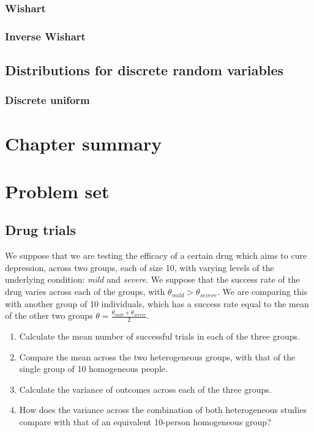 \documentclass[11pt,fullpage]{book}
\begin{document}
\subsubsection{Wishart}
\subsubsection{Inverse Wishart}

\subsection{Distributions for discrete random variables}
\subsubsection{Discrete uniform}

\section{Chapter summary}
\section{Problem set}
\subsection{Drug trials}
We suppose that we are testing the efficacy of a certain drug which aims to cure depression, across two groups, each of size 10, with varying levels of the underlying condition: \textit{mild} and \textit{severe}. We suppose that the success rate of the drug varies across each of the groups, with $\theta_{mild}>\theta_{severe}$. We are comparing this with another group of 10 individuals, which has a success rate equal to the mean of the other two groups $\theta = \frac{\theta_{mild}+\theta_{severe}}{2}$.

\begin{enumerate}
\item Calculate the mean number of successful trials in each of the three groups.
\item Compare the mean across the two heterogeneous groups, with that of the single group of 10 homogeneous people.
\item Calculate the variance of outcomes across each of the three groups.
\item How does the variance across the combination of both heterogeneous studies compare with that of an equivalent 10-person homogeneous group?
\end{enumerate}
\end{document}
